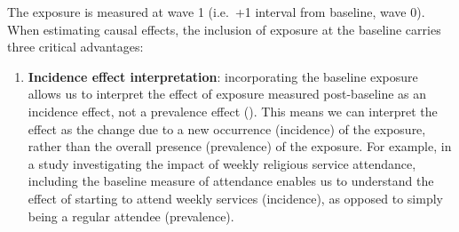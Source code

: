 \documentclass[
  singlecolumn]{article}
\providecommand{\tightlist}{%
  \setlength{\itemsep}{0pt}\setlength{\parskip}{0pt}}\usepackage{longtable,booktabs,array}
\begin{document}
The exposure is measured at wave 1 (i.e.~+1 interval from baseline, wave
0). When estimating causal effects, the inclusion of exposure at the
baseline carries three critical advantages:

\begin{enumerate}
\def\labelenumi{\alph{enumi}.}
\tightlist
\item
  \textbf{Incidence effect interpretation}: incorporating the baseline
  exposure allows us to interpret the effect of exposure measured
  post-baseline as an incidence effect, not a prevalence effect
  (). This
  means we can interpret the effect as the change due to a new
  occurrence (incidence) of the exposure, rather than the overall
  presence (prevalence) of the exposure. For example, in a study
  investigating the impact of weekly religious service attendance,
  including the baseline measure of attendance enables us to understand
  the effect of starting to attend weekly services (incidence), as
  opposed to simply being a regular attendee (prevalence).
\end{enumerate}
\end{document}
